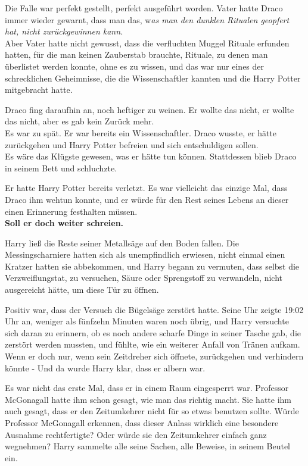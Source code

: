 {Die Falle war perfekt gestellt, perfekt ausgeführt worden. Vater hatte Draco immer wieder gewarnt, dass man das, w\emph{as man den dunklen Ritualen geopfert hat, nicht zurückgewinnen kann.}\\ Aber Vater hatte nicht gewusst, dass die verfluchten Muggel Rituale erfunden hatten, für die man keinen Zauberstab brauchte, Rituale, zu denen man überlistet werden konnte, ohne es zu wissen, und das war nur eines der schrecklichen Geheimnisse, die die Wissenschaftler kannten und die Harry Potter mitgebracht hatte.

Draco fing daraufhin an, noch heftiger zu weinen. Er wollte das nicht, er wollte das nicht, aber es gab kein Zurück mehr.\\ Es war zu spät. Er war bereits ein Wissenschaftler. Draco wusste, er hätte zurückgehen und Harry Potter befreien und sich entschuldigen sollen.\\ Es wäre das Klügste gewesen, was er hätte tun können. Stattdessen blieb Draco in seinem Bett und schluchzte.

Er hatte Harry Potter bereits verletzt. Es war vielleicht das einzige Mal, dass Draco ihm wehtun konnte, und er würde für den Rest seines Lebens an dieser einen Erinnerung festhalten müssen.\\

\hfill\break \textbf{Soll er doch weiter schreien.}

Harry ließ die Reste seiner Metallsäge auf den Boden fallen. Die Messingscharniere hatten sich als unempfindlich erwiesen, nicht einmal einen Kratzer hatten sie abbekommen, und Harry begann zu vermuten, dass selbst die Verzweiflungstat, zu versuchen, Säure oder Sprengstoff zu verwandeln, nicht ausgereicht hätte, um diese Tür zu öffnen.

Positiv war, dass der Versuch die Bügelsäge zerstört hatte. Seine Uhr zeigte 19:02 Uhr an, weniger als fünfzehn Minuten waren noch übrig, und Harry versuchte sich daran zu erinnern, ob es noch andere scharfe Dinge in seiner Tasche gab, die zerstört werden mussten, und fühlte, wie ein weiterer Anfall von Tränen aufkam.\\ Wenn er doch nur, wenn sein Zeitdreher sich öffnete, zurückgehen und verhindern könnte - Und da wurde Harry klar, dass er albern war.

Es war nicht das erste Mal, dass er in einem Raum eingesperrt war. Professor McGonagall hatte ihm schon gesagt, wie man das richtig macht. Sie hatte ihm auch gesagt, dass er den Zeitumkehrer nicht für so etwas benutzen sollte. Würde Professor McGonagall erkennen, dass dieser Anlass wirklich eine besondere Ausnahme rechtfertigte? Oder würde sie den Zeitumkehrer einfach ganz wegnehmen? Harry sammelte alle seine Sachen, alle Beweise, in seinem Beutel ein.

}
